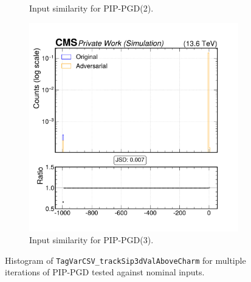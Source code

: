 \begin{figure}[htbp]
\begin{subfigure}[t]{0.32\textwidth}
    \caption*{Input similarity for PIP-PGD(2).}
  \end{subfigure}\hfill
  \begin{subfigure}[t]{0.32\textwidth}
    \includegraphics[width=\linewidth]{media/output/features/compare/combined_it_3/cmp_global_features_TagVarCSV_trackSip3dValAboveCharm.pdf}
    \caption*{Input similarity for PIP-PGD(3).}
  \end{subfigure}

  \caption*{Histogram of \texttt{TagVarCSV\_trackSip3dValAboveCharm} for multiple iterations of PIP-PGD tested against nominal inputs.}
  \label{fig:combined_input_TagVarCSV_trackSip3dValAboveCharm}
\end{figure}

